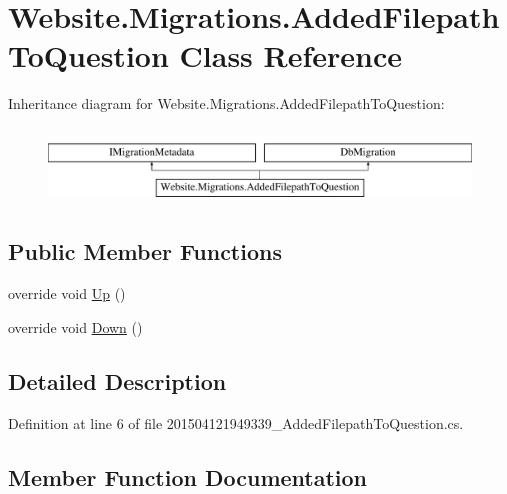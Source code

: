 \hypertarget{class_website_1_1_migrations_1_1_added_filepath_to_question}{}\section{Website.\+Migrations.\+Added\+Filepath\+To\+Question Class Reference}
\label{class_website_1_1_migrations_1_1_added_filepath_to_question}
Inheritance diagram for Website.\+Migrations.\+Added\+Filepath\+To\+Question\+:\begin{figure}[H]
\begin{center}
\leavevmode
\includegraphics[height=2.000000cm]{class_website_1_1_migrations_1_1_added_filepath_to_question}
\end{center}
\end{figure}
\subsection*{Public Member Functions}
\begin{DoxyCompactItemize}
\item 
override void \hyperlink{class_website_1_1_migrations_1_1_added_filepath_to_question_a5f18644ecfb2030792960169af0d0a24}{Up} ()
\item 
override void \hyperlink{class_website_1_1_migrations_1_1_added_filepath_to_question_a5a9f5667dd903186786a7cb19653771f}{Down} ()
\end{DoxyCompactItemize}


\subsection{Detailed Description}


Definition at line 6 of file 201504121949339\+\_\+\+Added\+Filepath\+To\+Question.\+cs.



\subsection{Member Function Documentation}
\hypertarget{class_website_1_1_migrations_1_1_added_filepath_to_question_a5a9f5667dd903186786a7cb19653771f}{}

